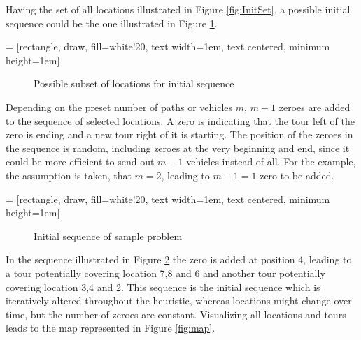 \documentclass[final,5p,times,twocolumn]{elsarticle}
\begin{document}
{{Having the set of all locations illustrated in Figure \ref{fig:InitSet}, a possible initial sequence could be the one illustrated in Figure \ref{fig:InitSelLoc}.  

 = [rectangle, draw, fill=white!20, 
    text width=1em, text centered, minimum height=1em]

\begin{figure}[htbp]
\centering
{}
\caption{Possible subset of locations for initial sequence}
\label{fig:InitSelLoc}
\end{figure}

Depending on the preset number of paths or vehicles $m$, $m-1$ zeroes are added to the sequence of selected locations. A zero is indicating that the tour left of the zero is ending and a new tour right of it is starting. The position of the zeroes in the sequence is random, including zeroes at the very beginning and end, since it could be more efficient to send out $m-1$ vehicles instead of all. For the example, the assumption is taken, that $m=2$, leading to $m-1=1$ zero to be added.

 = [rectangle, draw, fill=white!20, 
    text width=1em, text centered, minimum height=1em]

\begin{figure}[!h]
\centering
{}
\caption{Initial sequence of sample problem}
\label{fig:InitSeq}
\end{figure} 

In the sequence illustrated in Figure \ref{fig:InitSeq} the zero is added at position 4, leading to a tour potentially covering location 7,8 and 6 and another tour potentially covering location 3,4 and 2. This sequence is the initial sequence which is iteratively altered throughout the heuristic, whereas locations might change over time, but the number of zeroes are constant. Visualizing all locations and tours leads to the map represented in Figure \ref{fig:map}.

}}
\end{document}
